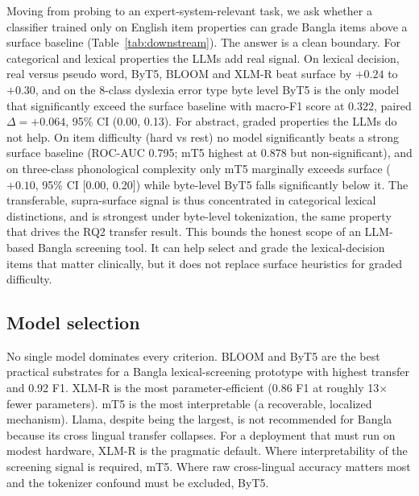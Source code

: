 \documentclass[preprint,12pt]{elsarticle}
\begin{document}
Moving from probing to an expert-system-relevant task, we ask whether a classifier trained only on English item properties can grade Bangla items above a surface baseline (Table~\ref{tab:downstream}). The answer is a clean boundary. For categorical and lexical properties the LLMs add real signal. On lexical decision, real versus pseudo word, ByT5, BLOOM and XLM-R beat surface by $+0.24$ to $+0.30$, and on the 8-class dyslexia error type byte level ByT5 is the only model that significantly exceed the surface baseline with macro-F1 score at 0.322, paired $\Delta{=}{+}0.064$, 95\% CI (0.00, 0.13). For abstract, graded properties the LLMs do not help. On item difficulty (hard vs rest) no model significantly beats a strong surface baseline (ROC-AUC 0.795; mT5 highest at 0.878 but non-significant), and on three-class phonological complexity only mT5 marginally exceeds surface ($+0.10$, 95\% CI [0.00, 0.20]) while byte-level ByT5 falls significantly below it. The transferable, supra-surface signal is thus concentrated in categorical lexical distinctions, and is strongest under byte-level tokenization, the same property that drives the RQ2 transfer result. This bounds the honest scope of an LLM-based Bangla screening tool. It can help select and grade the lexical-decision items that matter clinically, but it does not replace surface heuristics for graded difficulty.

\subsection{Model selection}
No single model dominates every criterion. BLOOM and ByT5 are the best practical substrates for a Bangla lexical-screening prototype with highest transfer and 0.92 F1. XLM-R is the most parameter-efficient (0.86 F1 at roughly 13$\times$ fewer parameters). mT5 is the most interpretable (a recoverable, localized mechanism). Llama, despite being the largest, is not recommended for Bangla because its cross lingual transfer collapses. For a deployment that must run on modest hardware, XLM-R is the pragmatic default. Where interpretability of the screening signal is required, mT5. Where raw cross-lingual accuracy matters most and the tokenizer confound must be excluded, ByT5.

\end{document}
